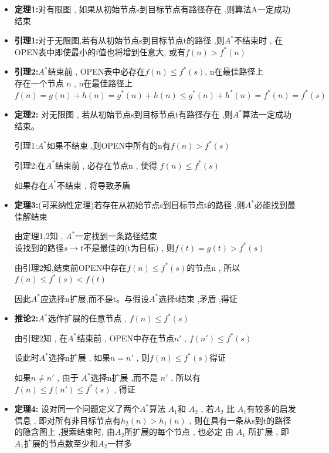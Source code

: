 \documentclass[UTF8,a4paper]{ctexart}
\begin{document}
\begin{itemize}
	\item \textbf{定理1:}对有限图 , 如果从初始节点s到目标节点有路径存在 ,则算法A一定成功结束
	\item \textbf{引理1:}对于无限图,若有从初始节点s到目标节点t的路径 ,则$A^*$不结束时 , 在OPEN表中即使最小的f值也将增到任意大, 或有$f(n) > f^*(n)$
	\item \textbf{引理2:}$A^*$结束前 , OPEN表中必存在$f(n)\leq f^*(s)$, n在最佳路径上\\
	      存在一个节点 n , n在最佳路径上 $f(n) = g(n) + h(n) = g^*(n) + h(n) \leq g^*(n) + h^*(n) = f^*(n) = f^*(s)$
	\item \textbf{定理2:} 对无限图 , 若从初始节点s到目标节点t有路径存在 ,则$A^*$算法一定成功结束。

	      引理1:$A^*$如果不结束 ,则OPEN中所有的n有$f(n) > f^*(s)$

	      引理2:在$A^*$结束前 , 必存在节点n , 使得 $f(n) \leq f^*(s)$

	      如果存在$A^*$不结束 , 将导致矛盾
	\item \textbf{定理3:}(可采纳性定理)若存在从初始节点s到目标节点t的路径 ,则$A^*$必能找到最佳解结束

	      由定理1,2知 , $A^*$一定找到一条路径结束 \\
	      设找到的路径$s\to t$不是最佳的(t为目标) , 则$f(t) = g(t) > f^*(s)$

	      由引理2知,结束前OPEN中存在$f(n) \leq f^*(s)$的节点n , 所以$f(n) \leq f^*(s) < f(t)$

	      因此$A^*$应选择n扩展,而不是t。与假设$A^*$选择t结束 ,矛盾 ,得证

	\item \textbf{推论2:}$A^*$选作扩展的任意节点 , $f(n) \leq f^*(s)$

	      由引理2知 , 在$A^*$结束前 , OPEN中存在节点$n'$ , $f(n') \leq f^*(s)$

	      设此时$A^*$选择n扩展 , 如果$n = n'$ , 则$f(n) \leq f^*(s)$得证

	      如果$n\neq n'$ , 由于 $A^*$选择n扩展 ,而不是 $n'$ , 所以有
	      $f(n) \leq f(n') \leq f^*(s)$ , 得证

	\item \textbf{定理4:} 设对同一个问题定义了两个$A^*$算法 $A_1
	      $和 $A_2$ , 若$A_2$ 比 $A_1$有较多的启发信息 , 即对所有非目标节点有$h_2(n) > h_1(n)$ , 则在具有一条从s到t的路径的隐含图上 ,搜索结束时, 由$A_2$所扩展的每个节点 , 也必定 由 $A_1$ 所扩展 , 即$A_1$扩展的节点数至少和$A_2$一样多


\end{itemize}
\end{document}

